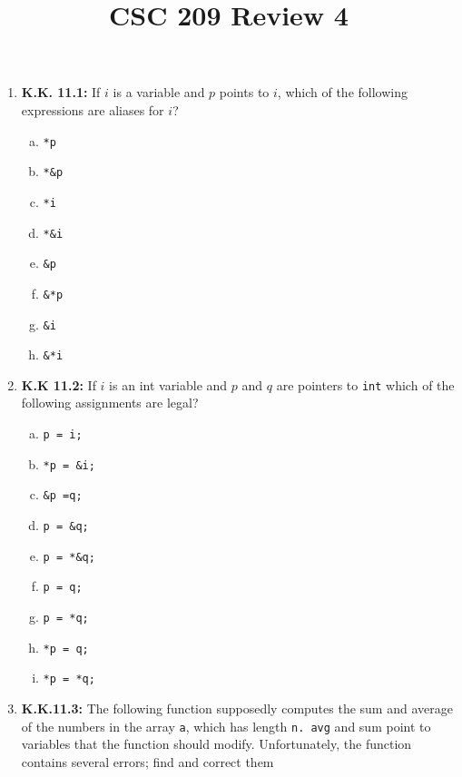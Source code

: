 \documentclass[12pt]{article}
\begin{document}
\title{CSC 209 Review 4}
\maketitle

\bigskip

\begin{enumerate}[1.]
    \item \textbf{K.K. 11.1:} If $i$ is a variable and $p$ points to $i$,
    which of the following expressions are aliases for $i$?

    \begin{enumerate}[a)]
        \item \texttt{*p}
        \item \texttt{*\&p}
        \item \texttt{*i}
        \item \texttt{*\&i}
        \item \texttt{\&p}
        \item \texttt{\&*p}
        \item \texttt{\&i}
        \item \texttt{\&*i}
    \end{enumerate}

    \item \textbf{K.K 11.2:} If $i$ is an int variable and $p$ and $q$ are pointers to \texttt{int}
    which of the following assignments are legal?

    \begin{enumerate}[a)]
        \item \texttt{p = i;}
        \item \texttt{*p = \&i;}
        \item \texttt{\&p =q;}
        \item \texttt{p = \&q;}
        \item \texttt{p = *\&q;}
        \item \texttt{p = q;}
        \item \texttt{p = *q;}
        \item \texttt{*p = q;}
        \item \texttt{*p = *q;}
    \end{enumerate}

    \item \textbf{K.K.11.3:} The following function supposedly computes the sum and average of the
    numbers in the array \texttt{a}, which has length \texttt{n. avg} and sum point to variables
    that the function should modify. Unfortunately, the function contains several errors; find
    and correct them


\end{enumerate}
\end{document}
